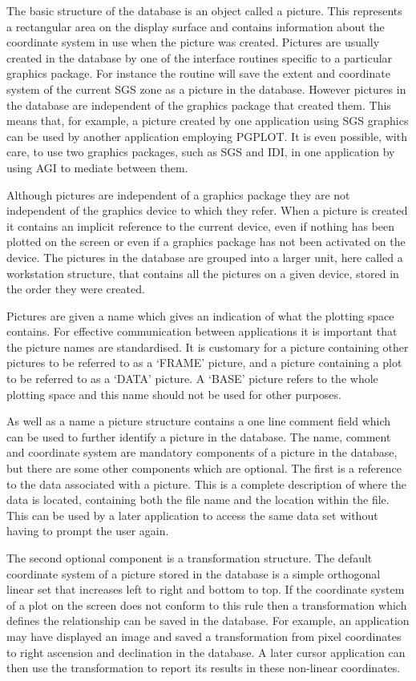 \documentclass[twoside,11pt]{starlink}
\begin{document}
The basic structure of the database is an object called a picture. This
represents a rectangular area on the display surface and contains
information about the coordinate system in use when the picture was
created. Pictures are usually created in the database by one of the
interface routines specific to a particular graphics package. For
instance the routine
 will save the extent and coordinate
system of the current SGS zone as a picture in the database. However
pictures in the database are independent of the graphics package that
created them. This means that, for example, a picture created by one
application using SGS graphics can be used by another application
employing PGPLOT. It is even possible, with care, to use two graphics
packages, such as SGS and IDI, in one application by using AGI to
mediate between them.

Although pictures are independent of a graphics package they are not
independent of the graphics device to which they refer. When a picture
is created it contains an implicit reference to the current device,
even if nothing has been plotted on the screen or even if a graphics
package has not been activated on the device.
The pictures in the database are grouped into a larger unit, here called
a workstation structure, that contains all the pictures on a given device,
stored in the order they were created.

Pictures are given a name which gives an indication of what the plotting
space contains. For effective communication between applications it is
important that the picture names are standardised. It is customary for
a picture containing other pictures to be referred to as a `FRAME' picture,
and a picture containing a plot to be referred to as a `DATA' picture.
A `BASE' picture refers to the whole plotting space and this name should
not be used for other purposes.

As well as a name a picture structure contains a one line comment field
which can be used to further identify a picture in the database. The name,
comment and coordinate system are mandatory components of a picture in
the database, but there are some other components which are optional.
The first is a reference to the data associated with a picture. This
is a complete description of where the data is located, containing both
the file name and the location within the file. This can be used by a
later application to access the same data set without having to prompt
the user again.

The second optional component is a transformation structure.
The default coordinate system of a picture stored in the database is a
simple orthogonal linear set that increases left to right and bottom to top.
If the coordinate system of a plot on the screen does not conform to this
rule then a transformation which defines the relationship can
be saved in the database.
For example, an application may have displayed an image and saved a
transformation from pixel coordinates to right ascension and declination
in the database. A later cursor application can then use the transformation
to report its results in these non-linear coordinates.
\end{document}
